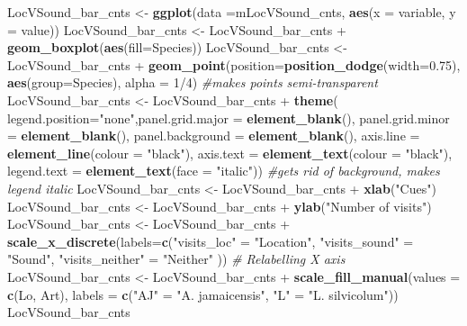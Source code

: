 \documentclass[]{article}
\newenvironment{Shaded}{\begin{snugshade}}{\end{snugshade}}
\newcommand{\KeywordTok}[1]{\textcolor[rgb]{0.13,0.29,0.53}{\textbf{{#1}}}}
\newcommand{\DataTypeTok}[1]{\textcolor[rgb]{0.13,0.29,0.53}{{#1}}}
\newcommand{\DecValTok}[1]{\textcolor[rgb]{0.00,0.00,0.81}{{#1}}}
\newcommand{\FloatTok}[1]{\textcolor[rgb]{0.00,0.00,0.81}{{#1}}}
\newcommand{\StringTok}[1]{\textcolor[rgb]{0.31,0.60,0.02}{{#1}}}
\newcommand{\CommentTok}[1]{\textcolor[rgb]{0.56,0.35,0.01}{\textit{{#1}}}}
\newcommand{\NormalTok}[1]{{#1}}
\begin{document}
\begin{Shaded}
\begin{Highlighting}[]
\NormalTok{LocVSound_bar_cnts <-}\StringTok{ }\KeywordTok{ggplot}\NormalTok{(}\DataTypeTok{data =}\NormalTok{mLocVSound_cnts, }\KeywordTok{aes}\NormalTok{(}\DataTypeTok{x =} \NormalTok{variable, }\DataTypeTok{y =} \NormalTok{value))}
\NormalTok{LocVSound_bar_cnts <-}\StringTok{ }\NormalTok{LocVSound_bar_cnts +}\StringTok{ }\KeywordTok{geom_boxplot}\NormalTok{(}\KeywordTok{aes}\NormalTok{(}\DataTypeTok{fill=}\NormalTok{Species))}
\NormalTok{LocVSound_bar_cnts <-}\StringTok{ }\NormalTok{LocVSound_bar_cnts +}\StringTok{ }\KeywordTok{geom_point}\NormalTok{(}\DataTypeTok{position=}\KeywordTok{position_dodge}\NormalTok{(}\DataTypeTok{width=}\FloatTok{0.75}\NormalTok{), }\KeywordTok{aes}\NormalTok{(}\DataTypeTok{group=}\NormalTok{Species), }\DataTypeTok{alpha =} \DecValTok{1}\NormalTok{/}\DecValTok{4}\NormalTok{) }\CommentTok{#makes points semi-transparent}
\NormalTok{LocVSound_bar_cnts <-}\StringTok{ }\NormalTok{LocVSound_bar_cnts +}\StringTok{  }\KeywordTok{theme}\NormalTok{( }\DataTypeTok{legend.position=}\StringTok{"none"}\NormalTok{,}\DataTypeTok{panel.grid.major =} \KeywordTok{element_blank}\NormalTok{(), }\DataTypeTok{panel.grid.minor =} \KeywordTok{element_blank}\NormalTok{(),}
\DataTypeTok{panel.background =} \KeywordTok{element_blank}\NormalTok{(), }\DataTypeTok{axis.line =} \KeywordTok{element_line}\NormalTok{(}\DataTypeTok{colour =} \StringTok{"black"}\NormalTok{), }\DataTypeTok{axis.text =} \KeywordTok{element_text}\NormalTok{(}\DataTypeTok{colour =} \StringTok{"black"}\NormalTok{), }\DataTypeTok{legend.text =} \KeywordTok{element_text}\NormalTok{(}\DataTypeTok{face =} \StringTok{"italic"}\NormalTok{))  }\CommentTok{#gets rid of background, makes legend italic}
\NormalTok{LocVSound_bar_cnts <-}\StringTok{ }\NormalTok{LocVSound_bar_cnts +}\StringTok{ }\KeywordTok{xlab}\NormalTok{(}\StringTok{"Cues"}\NormalTok{)}
\NormalTok{LocVSound_bar_cnts <-}\StringTok{ }\NormalTok{LocVSound_bar_cnts +}\StringTok{ }\KeywordTok{ylab}\NormalTok{(}\StringTok{"Number of visits"}\NormalTok{)}
\NormalTok{LocVSound_bar_cnts <-}\StringTok{ }\NormalTok{LocVSound_bar_cnts +}\StringTok{ }\KeywordTok{scale_x_discrete}\NormalTok{(}\DataTypeTok{labels=}\KeywordTok{c}\NormalTok{(}\StringTok{"visits_loc"} \NormalTok{=}\StringTok{ "Location"}\NormalTok{, }\StringTok{"visits_sound"} \NormalTok{=}\StringTok{ "Sound"}\NormalTok{,}
                              \StringTok{"visits_neither"} \NormalTok{=}\StringTok{ "Neither"} \NormalTok{))  }\CommentTok{# Relabelling X axis}
\NormalTok{LocVSound_bar_cnts <-}\StringTok{ }\NormalTok{LocVSound_bar_cnts +}\StringTok{ }\KeywordTok{scale_fill_manual}\NormalTok{(}\DataTypeTok{values =} \KeywordTok{c}\NormalTok{(Lo, Art), }\DataTypeTok{labels =} \KeywordTok{c}\NormalTok{(}\StringTok{"AJ"} \NormalTok{=}\StringTok{ "A. jamaicensis"}\NormalTok{, }\StringTok{"L"} \NormalTok{=}\StringTok{ "L. silvicolum"}\NormalTok{))}
\NormalTok{LocVSound_bar_cnts}
\end{Highlighting}
\end{Shaded}
\end{document}
